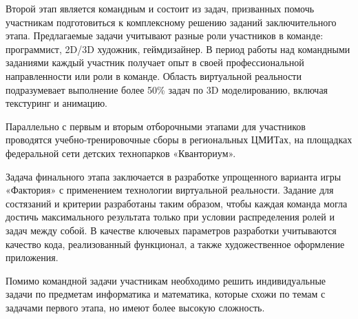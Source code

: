 Второй этап является командным и состоит из задач, призванных помочь участникам подготовиться к комплексному решению заданий заключительного этапа. Предлагаемые задачи учитывают разные роли участников в команде: программист, 2D/3D художник, геймдизайнер. В период работы над командными заданиями каждый участник получает опыт в своей профессиональной направленности или роли в команде. Область виртуальной реальности подразумевает выполнение более 50\% задач по 3D моделированию, включая текстуринг и анимацию. 

Параллельно с первым и вторым отборочными этапами для участников проводятся учебно-тренировочные сборы в региональных ЦМИТах, на площадках федеральной сети детских технопарков «Кванториум». 

Задача финального этапа заключается в разработке упрощенного варианта игры «Фактория» с применением технологии виртуальной реальности. Задание для состязаний и критерии разработаны таким образом, чтобы каждая команда могла достичь максимального результата только при условии распределения ролей и задач между собой. В качестве ключевых параметров разработки учитываются качество кода, реализованный функционал, а также художественное оформление приложения. 

Помимо командной задачи участникам необходимо решить индивидуальные задачи по предметам информатика и математика, которые схожи по темам с задачами первого этапа, но имеют более высокую сложность.